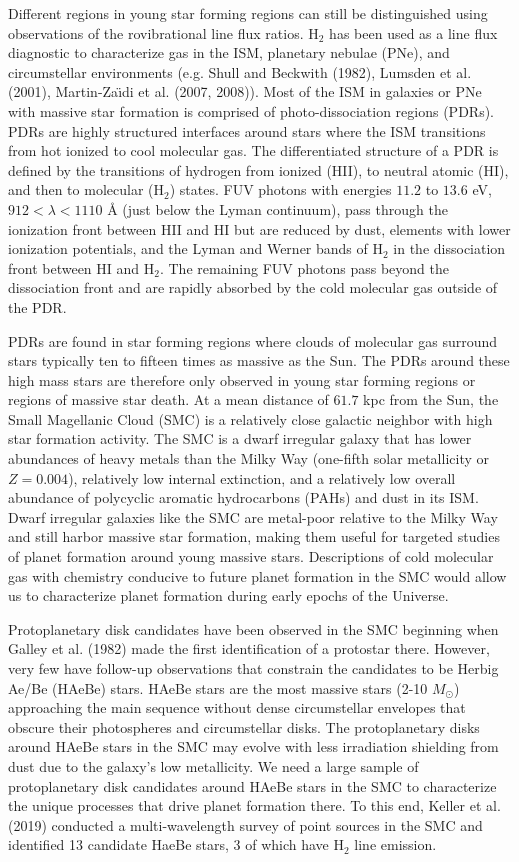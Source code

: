 \documentclass[12pt, letterpaper]{book}
\begin{document}
Different regions in young star forming regions can still be distinguished using observations of the rovibrational line flux ratios. $\textrm{H}_2$ has been used as a line flux diagnostic to characterize gas in the ISM, planetary nebulae (PNe), and circumstellar environments (e.g. Shull and Beckwith (1982), Lumsden et al.(2001), Martin-Za{\"\i}di et al. (2007, 2008)). Most of the ISM in galaxies or PNe with massive star formation is comprised of photo-dissociation regions (PDRs). PDRs are highly structured interfaces around stars where the ISM transitions from hot ionized to cool molecular gas. The differentiated structure of a PDR is defined by the transitions of hydrogen from ionized (HII), to neutral atomic (HI), and then to molecular ($\textrm{H}_2$) states. FUV photons with energies $11.2$ to $13.6$ eV, $912 < \lambda < 1110$ {\AA} (just below the Lyman continuum), pass through the ionization front between HII and HI but are reduced by dust, elements with lower ionization potentials, and the Lyman and Werner bands of $\textrm{H}_2$ in the dissociation front between HI and $\textrm{H}_2$. The remaining FUV photons pass beyond the dissociation front and are rapidly absorbed by the cold molecular gas outside of the PDR.

PDRs are found in star forming regions where clouds of molecular gas surround stars typically ten to fifteen times as massive as the Sun. The PDRs around these high mass stars are therefore only observed in young star forming regions or regions of massive star death. At a mean distance of $61.7$ kpc from the Sun, the Small Magellanic Cloud (SMC) is a relatively close galactic neighbor with high star formation activity. The SMC is a dwarf irregular galaxy that has lower abundances of heavy metals than the Milky Way (one-fifth solar metallicity or $Z = 0.004$), relatively low internal extinction, and a relatively low overall abundance of polycyclic aromatic hydrocarbons (PAHs) and dust in its ISM. Dwarf irregular galaxies like the SMC are metal-poor relative to the Milky Way and still harbor massive star formation, making them useful for targeted studies of planet formation around young massive stars. Descriptions of cold molecular gas with chemistry conducive to future planet formation in the SMC would allow us to characterize planet formation during early epochs of the Universe.

Protoplanetary disk candidates have been observed in the SMC beginning when Galley et al. (1982) made the first identification of a protostar there. However, very few have follow-up observations that constrain the candidates to be Herbig Ae/Be (HAeBe) stars. HAeBe stars are the most massive stars (2-10 $M_{\odot}$) approaching the main sequence without dense circumstellar envelopes that obscure their photospheres and circumstellar disks. The protoplanetary disks around HAeBe stars in the SMC may evolve with less irradiation shielding from dust due to the galaxy's low metallicity. We need a large sample of protoplanetary disk candidates around HAeBe stars in the SMC to characterize the unique processes that drive planet formation there. To this end, Keller et al. (2019) conducted a multi-wavelength survey of point sources in the SMC and identified 13 candidate HaeBe stars, 3 of which have $\textrm{H}_2$ line emission.
\end{document}
